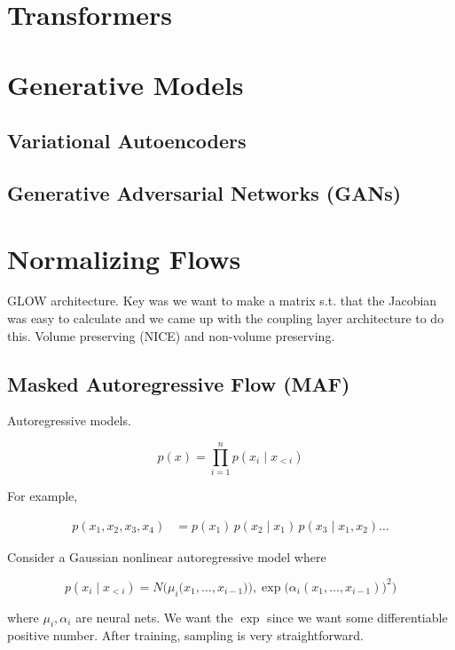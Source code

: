 \documentclass{article}
\theoremstyle{definition}
\theoremstyle{remark}
\theoremstyle{definition}
\begin{document}
\section{Transformers}



\section{Generative Models}

\subsection{Variational Autoencoders}

\subsection{Generative Adversarial Networks (GANs)}


\section{Normalizing Flows}


  GLOW architecture. Key was we want to make a matrix s.t. that the Jacobian was easy to calculate and we came up with the coupling layer architecture to do this. Volume preserving (NICE) and non-volume preserving. 

  \subsection{Masked Autoregressive Flow (MAF)}

    Autoregressive models.  

      \[p(x) = \prod_{i=1}^n p(x_i \mid x_{<i})\]

    For example, 

    \begin{align*} 
      p(x_1, x_2, x_3, x_4) & = p(x_1) \, p(x_2 \mid x_1) \, p(x_3 \mid x_1, x_2) \ldots 
    \end{align*}

    Consider a Gaussian nonlinear autoregressive model where 

      \[p(x_i \mid x_{< i}) = N\big( \mu_i \big(x_1, \ldots, x_{i-1}) \big) , \exp \big( \alpha_i (x_1, \ldots, x_{i-1}) \big)^2 \big) \]

    where $\mu_i, \alpha_i$ are neural nets. We want the $\exp$ since we want some differentiable positive number. After training, sampling is very straightforward. 
\end{document}
